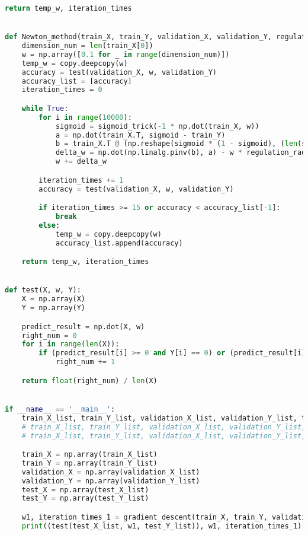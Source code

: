 \documentclass[withoutpreface,bwprint]{cumcmthesis}
\begin{document}
\begin{appendix}
\begin{lstlisting}[language=python]
    return temp_w, iteration_times


def Newton_method(train_X, train_Y, validation_X, validation_Y, regulation_radio=0.0):
    dimension_num = len(train_X[0])
    w = np.array([0.1 for _ in range(dimension_num)])
    temp_w = copy.deepcopy(w)
    accuracy = test(validation_X, w, validation_Y)
    accuracy_list = [accuracy]
    iteration_times = 0

    while True:
        for i in range(10000):
            sigmoid = sigmoid_trick(-1 * np.dot(train_X, w))
            a = np.dot(train_X.T, sigmoid - train_Y)
            b = train_X.T @ (np.reshape(sigmoid * (1 - sigmoid), (len(sigmoid), 1)) * train_X)
            delta_w = np.dot(np.linalg.pinv(b), a) - w * regulation_radio
            w += delta_w

        iteration_times += 1
        accuracy = test(validation_X, w, validation_Y)

        if iteration_times >= 15 or accuracy < accuracy_list[-1]:
            break
        else:
            temp_w = copy.deepcopy(w)
            accuracy_list.append(accuracy)

    return temp_w, iteration_times


def test(X, w, Y):
    X = np.array(X)
    Y = np.array(Y)

    predict_result = np.dot(X, w)
    right_num = 0
    for i in range(len(X)):
        if (predict_result[i] >= 0 and Y[i] == 0) or (predict_result[i] < 0 and Y[i] == 1):
            right_num += 1

    return float(right_num) / len(X)


if __name__ == '__main__':
    train_X_list, train_Y_list, validation_X_list, validation_Y_list, test_X_list, test_Y_list = get_data_guass(100, 20, 100, 0.7, False)
    # train_X_list, train_Y_list, validation_X_list, validation_Y_list, test_X_list, test_Y_list = get_data_uci("iris")
    # train_X_list, train_Y_list, validation_X_list, validation_Y_list, test_X_list, test_Y_list = get_data_uci("adult")

    train_X = np.array(train_X_list)
    train_Y = np.array(train_Y_list)
    validation_X = np.array(validation_X_list)
    validation_Y = np.array(validation_Y_list)
    test_X = np.array(test_X_list)
    test_Y = np.array(test_Y_list)

    w1, iteration_times_1 = gradient_descent(train_X, train_Y, validation_X, validation_Y, gradient_regulation_radio)
    print((test(test_X_list, w1, test_Y_list)), w1, iteration_times_1)


\end{lstlisting}
\end{appendix}
\end{document}
